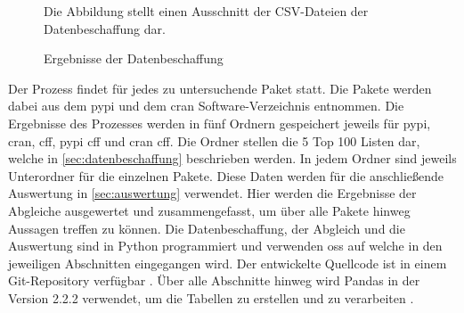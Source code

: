 \begin{figure}
    \caption{Ergebnisse der Datenbeschaffung}
    \label{fig:datenbeschaffung_ergebnisse}
    \small
    Die Abbildung stellt einen Ausschnitt der CSV-Dateien der Datenbeschaffung dar.
\end{figure}

Der Prozess findet für jedes zu untersuchende Paket statt.
Die Pakete werden dabei aus dem \gls{pypi} und dem \gls{cran} Software-Verzeichnis entnommen.
Die Ergebnisse des Prozesses werden in fünf Ordnern gespeichert jeweils für \gls{pypi}, \gls{cran}, \gls{cff}, \gls{pypi} \gls{cff} und \gls{cran} \gls{cff}.
Die Ordner stellen die 5 Top 100 Listen dar, welche in \autoref{sec:datenbeschaffung} beschrieben werden.
In jedem Ordner sind jeweils Unterordner für die einzelnen Pakete.
Diese Daten werden für die anschließende Auswertung in \autoref{sec:auswertung} verwendet.
Hier werden die Ergebnisse der Abgleiche ausgewertet und zusammengefasst, um über alle Pakete hinweg Aussagen treffen zu können.
Die Datenbeschaffung, der Abgleich und die Auswertung sind in Python programmiert und verwenden \gls{oss} auf welche in den jeweiligen Abschnitten eingegangen wird.
Der entwickelte Quellcode ist in einem Git-Repository verfügbar \autocite{jahrens_t20240710-softwareauthors-kj_2025}.
Über alle Abschnitte hinweg wird Pandas in der Version 2.2.2 verwendet, um die Tabellen zu erstellen und zu verarbeiten \autocite{the_pandas_development_team_pandas_2024}.





